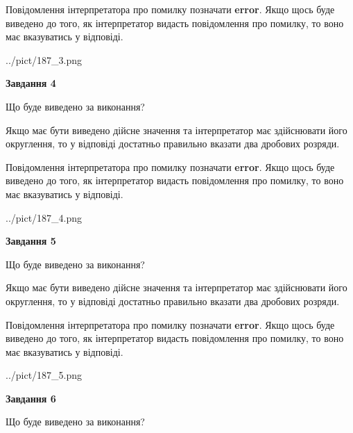 \documentclass[12pt, ukrainian]{article}
\begin{document}
{\begin {Large}
Повідомлення інтерпретатора про помилку позначати \textbf{error}.
Якщо щось буде виведено до того, як інтерпретатор видасть повідомлення про помилку, 
то воно має вказуватись у відповіді. \par

\begin{center}
	{../pict/187_3.png}
\end{center}
\newpage

{\begin {center}\textbf{Завдання 4}\end {center}}\par
Що буде виведено за виконання? \par

Якщо має бути виведено дійсне значення та інтерпретатор має здійснювати його округлення, 
то у відповіді достатньо правильно вказати два дробових розряди.

Повідомлення інтерпретатора про помилку позначати \textbf{error}.
Якщо щось буде виведено до того, як інтерпретатор видасть повідомлення про помилку, 
то воно має вказуватись у відповіді. \par

\begin{center}
	{../pict/187_4.png}
\end{center}
\newpage

{\begin {center}\textbf{Завдання 5}\end {center}}\par
Що буде виведено за виконання? \par

Якщо має бути виведено дійсне значення та інтерпретатор має здійснювати його округлення, 
то у відповіді достатньо правильно вказати два дробових розряди.

Повідомлення інтерпретатора про помилку позначати \textbf{error}.
Якщо щось буде виведено до того, як інтерпретатор видасть повідомлення про помилку, 
то воно має вказуватись у відповіді. \par

\begin{center}
	{../pict/187_5.png}
\end{center}
\newpage

{\begin {center}\textbf{Завдання 6}\end {center}}\par
Що буде виведено за виконання? \par


\end{Large}}
\end{document}
